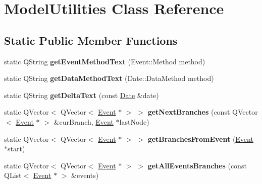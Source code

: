 \hypertarget{class_model_utilities}{\section{Model\-Utilities Class Reference}
\label{class_model_utilities}
}
\subsection*{Static Public Member Functions}
\begin{DoxyCompactItemize}
\item 
\hypertarget{class_model_utilities_aaa4721efa46f010b6e4886038a801c2a}{static Q\-String {\bfseries get\-Event\-Method\-Text} (Event\-::\-Method method)}\label{class_model_utilities_aaa4721efa46f010b6e4886038a801c2a}

\item 
\hypertarget{class_model_utilities_af0e93f69b70b128918ed0fb04dcbb917}{static Q\-String {\bfseries get\-Data\-Method\-Text} (Date\-::\-Data\-Method method)}\label{class_model_utilities_af0e93f69b70b128918ed0fb04dcbb917}

\item 
\hypertarget{class_model_utilities_ac9d926629925cd5624bb96e0a4b3c1c1}{static Q\-String {\bfseries get\-Delta\-Text} (const \hyperlink{class_date}{Date} \&date)}\label{class_model_utilities_ac9d926629925cd5624bb96e0a4b3c1c1}

\item 
\hypertarget{class_model_utilities_a8e58e3a30405fcd592317530b95d6787}{static Q\-Vector$<$ Q\-Vector$<$ \hyperlink{class_event}{Event} $\ast$ $>$ $>$ {\bfseries get\-Next\-Branches} (const Q\-Vector$<$ \hyperlink{class_event}{Event} $\ast$ $>$ \&cur\-Branch, \hyperlink{class_event}{Event} $\ast$last\-Node)}\label{class_model_utilities_a8e58e3a30405fcd592317530b95d6787}

\item 
\hypertarget{class_model_utilities_a121d89817971631cc818a220c6ae5849}{static Q\-Vector$<$ Q\-Vector$<$ \hyperlink{class_event}{Event} $\ast$ $>$ $>$ {\bfseries get\-Branches\-From\-Event} (\hyperlink{class_event}{Event} $\ast$start)}\label{class_model_utilities_a121d89817971631cc818a220c6ae5849}

\item 
\hypertarget{class_model_utilities_aff9d7abede6d424d2dfdc1cd8b3704d1}{static Q\-Vector$<$ Q\-Vector$<$ \hyperlink{class_event}{Event} $\ast$ $>$ $>$ {\bfseries get\-All\-Events\-Branches} (const Q\-List$<$ \hyperlink{class_event}{Event} $\ast$ $>$ \&events)}\label{class_model_utilities_aff9d7abede6d424d2dfdc1cd8b3704d1}


\end{DoxyCompactItemize}
